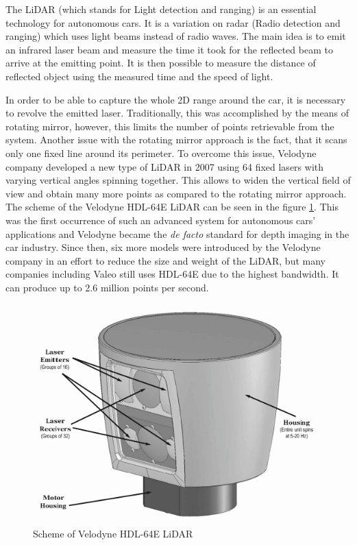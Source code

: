 The LiDAR (which stands for Light detection and ranging) is an essential technology for autonomous cars. It is a variation on radar (Radio detection and ranging) which uses light beams instead of radio waves. The main idea is to emit an infrared laser beam and measure the time it took for the reflected beam to arrive at the emitting point. It is then possible to measure the distance of reflected object using the measured time and the speed of light.

In order to be able to capture the whole 2D range around the car, it is necessary to revolve the emitted laser. Traditionally, this was accomplished by the means of rotating mirror, however, this limits the number of points retrievable from the system. Another issue with the rotating mirror approach is the fact, that it scans only one fixed line around its perimeter. To overcome this issue, Velodyne company developed a new type of LiDAR in 2007 using 64 fixed lasers with varying vertical angles spinning together. This allows to widen the vertical field of view and obtain many more points as compared to the rotating mirror approach. The scheme of the Velodyne HDL-64E LiDAR can be seen in the figure \ref{lidarscheme}. This was the first occurrence of such an advanced system for autonomous cars' applications and Velodyne became the {\em de facto} standard for depth imaging in the car industry. Since then, six more models were introduced by the Velodyne company in an effort to reduce the size and weight of the LiDAR, but many companies including Valeo still uses HDL-64E due to the highest bandwidth. It can produce up to 2.6 million points per second.

\begin{figure}
\centering
\includegraphics[keepaspectratio,width=0.98\textwidth]{img/lidar.png}
\caption{Scheme of Velodyne HDL-64E LiDAR}
\label{lidarscheme}
\end{figure}

